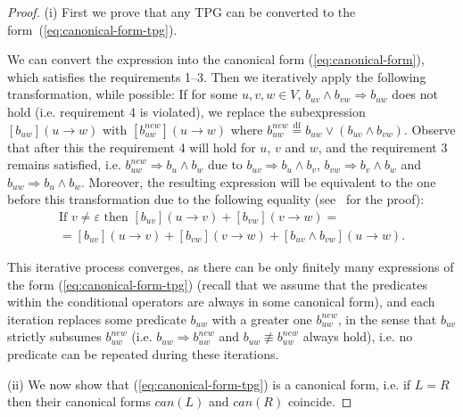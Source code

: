 \begin{proof}
(i) First we prove that any TPG can be converted to the form~(\ref{eq:canonical-form-tpg}).

We can convert the expression into the canonical form (\ref{eq:canonical-form}),
which satisfies the requirements 1--3. Then we iteratively apply the
following transformation, while possible: If for some $u,v,w\in V$,
$b_{uv}\wedge b_{vw}\Rightarrow b_{uw}$ does not hold (i.e. requirement
4 is violated), we replace the subexpression $[b_{uw}](u\rightarrow w)$
with $[b_{uw}^{\mathit{new}}](u\rightarrow w)$ where $b_{uw}^{\mathit{new}}\overset{\text{df}}{=}b_{uw}\vee(b_{uv}\wedge b_{vw})$.
Observe that after this the requirement 4 will hold for $u$, $v$
and $w$, and the requirement 3 remains satisfied, i.e. $b_{uw}^{\mathit{new}}\Rightarrow b_{u}\wedge b_{w}$
due to $b_{uv}\Rightarrow b_{u}\wedge b_{v}$, $b_{vw}\Rightarrow b_{v}\wedge b_{w}$
and $b_{uw}\Rightarrow b_{u}\wedge b_{w}$. Moreover, the resulting
expression will be equivalent to the one before this transformation
due to the following equality (see~\cite{2011_mokhov_pg} for the
proof):
\[
\begin{array}{c}
\mbox{{If\ }}v\neq\varepsilon\mbox{{\ then\ }}[b_{uv}](u\rightarrow v)+[b_{vw}](v\rightarrow w)=\\
=[b_{uv}](u\rightarrow v)+[b_{vw}](v\rightarrow w)+[b_{uv}\wedge b_{vw}](u\rightarrow w).
\end{array}
\]


This iterative process converges, as there can be only finitely many
expressions of the form (\ref{eq:canonical-form-tpg}) (recall that
we assume that the predicates within the conditional operators are
always in some canonical form), and each iteration replaces some predicate
$b_{uw}$ with a greater one $b_{uw}^{\mathit{new}}$, in the sense
that $b_{uv}$ strictly subsumes $b_{uw}^{\mathit{new}}$ (i.e. $b_{uw}\Rightarrow b_{uw}^{\mathit{new}}$
and $b_{uw}\not\equiv b_{uw}^{\mathit{new}}$ always hold), i.e. no
predicate can be repeated during these iterations.

(ii) We now show that (\ref{eq:canonical-form-tpg}) is a canonical
form, i.e. if $L=R$ then their canonical forms $\mathit{can}(L)$
and $\mathit{can}(R)$ coincide.


\end{proof}
